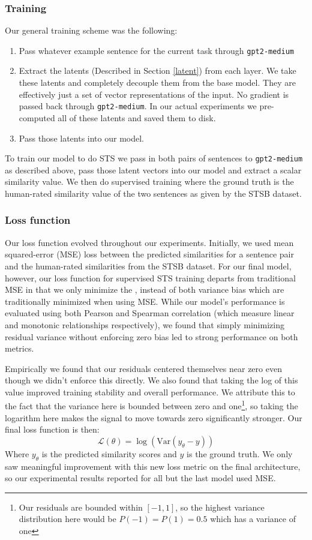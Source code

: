 \documentclass{article}
\begin{document}
\subsubsection{Training}
Our general training scheme was the following:
\begin{enumerate}
    \item Pass whatever example sentence for the current task through \verb|gpt2-medium|
    \item Extract the latents (Described in Section \ref{latent}) from each layer. We take these latents and completely decouple them from the base model. They are effectively just a set of vector representations of the input. No gradient is passed back through \verb|gpt2-medium|. In our actual experiments we pre-computed all of these latents and saved them to disk.
    \item Pass those latents into our model.
\end{enumerate}
To train our model to do STS we pass in both pairs of sentences to \verb|gpt2-medium| as described above, pass those latent vectors into our model and extract a scalar similarity value. We then do supervised training where the ground truth is the human-rated similarity value of the two sentences as given by the STSB dataset.

\subsubsection{Loss function}
Our loss function evolved throughout our experiments. Initially, we used mean squared-error (MSE) loss between the predicted similarities for a sentence pair and the human-rated similarities from the STSB dataset. For our final model, however, our loss function for supervised STS training departs from traditional MSE in that we only minimize the , instead of both variance  bias which are traditionally minimized when using MSE. While our model's performance is evaluated using both Pearson and Spearman correlation (which measure linear and monotonic relationships respectively), we found that simply minimizing residual variance without enforcing zero bias led to strong performance on both metrics. 

Empirically we found that our residuals centered themselves near zero even though we didn't enforce this directly. We also found that taking the log of this value improved training stability and overall performance. We attribute this to the fact that the variance here is bounded between zero and one\footnote{Our residuals are bounded within $[-1, 1]$, so the highest variance distribution here would be $P(-1) = P(1) = 0.5$ which has a variance of one}, so taking the logarithm here makes the signal to move towards zero significantly stronger. Our final loss function is then:
$$
\mathcal{L}(\theta) = \log(\text{Var}(y_\theta - y))
$$
Where $y_\theta$ is the predicted similarity scores and $y$ is the ground truth. We only saw meaningful improvement with this new loss metric on the final architecture, so our experimental results reported for all but the last model used MSE.
\end{document}
